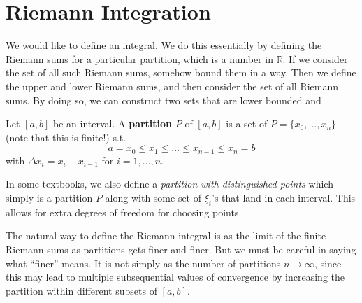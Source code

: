 \section{Riemann Integration} 

  We would like to define an integral. We do this essentially by defining the Riemann sums for a particular partition, which is a number in $\mathbb{R}$. If we consider the set of all such Riemann sums, somehow bound them in a way. Then we define the upper and lower Riemann sums, and then consider the set of all Riemann sums. By doing so, we can construct two sets that are lower bounded and

  \begin{definition}[Partition]
    Let $[a, b]$ be an interval. A \textbf{partition} $P$ of $[a, b]$ is a set of $P = \{x_0, \ldots, x_n\}$ (note that this is finite!) s.t. 
    \begin{equation}
      a = x_0 \leq x_1 \leq \ldots \leq x_{n-1} \leq x_n = b
    \end{equation}
    with $\Delta x_i = x_i - x_{i-1}$ for $i = 1, \ldots, n$. 
  \end{definition}

  In some textbooks, we also define a \textit{partition with distinguished points} which simply is a partition $P$ along with some set of $\xi_i$'s that land in each interval. This allows for extra degrees of freedom for choosing points.  

  The natural way to define the Riemann integral is as the limit of the finite Riemann sums as partitions gets finer and finer.  But we must be careful in saying what ``finer'' means. It is not simply as the number of partitions $n \rightarrow \infty$, since this may lead to multiple subsequential values of convergence by increasing the partition within different subsets of $[a,b]$. 

